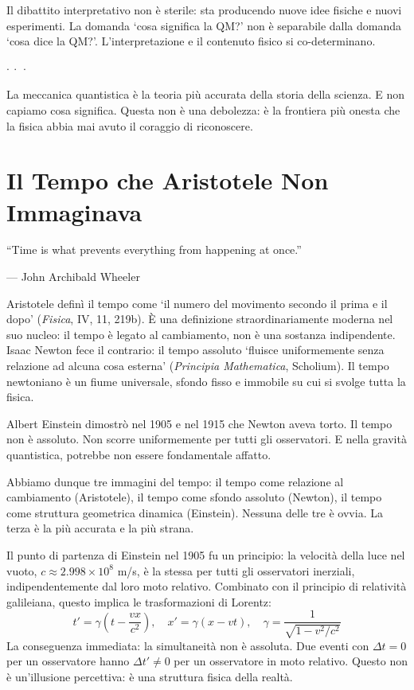\documentclass[12pt,a4paper,openany]{book}
\newcommand{\sezione}[1]{\vspace{1.2em}{\large\bfseries #1}\vspace{0.5em}\par}
\newcommand{\puntini}{\begin{center}$\cdot\ \cdot\ \cdot$\end{center}\vspace{0.3em}}
\begin{document}
Il dibattito interpretativo non è sterile: sta producendo nuove idee fisiche e nuovi esperimenti. La domanda `cosa significa la QM?' non è separabile dalla domanda `cosa dice la QM?'. L'interpretazione e il contenuto fisico si co-determinano.

\puntini

La meccanica quantistica è la teoria più accurata della storia della scienza. E non capiamo cosa significa. Questa non è una debolezza: è la frontiera più onesta che la fisica abbia mai avuto il coraggio di riconoscere.

\chapter{Il Tempo che Aristotele Non Immaginava}

\epigraph{``Time is what prevents everything from happening at once.''}{--- John Archibald Wheeler}

\sezione{Tre definizioni di tempo}

Aristotele definì il tempo come `il numero del movimento secondo il prima e il dopo' (\textit{Fisica}, IV, 11, 219b). È una definizione straordinariamente moderna nel suo nucleo: il tempo è legato al cambiamento, non è una sostanza indipendente. Isaac Newton fece il contrario: il tempo assoluto `fluisce uniformemente senza relazione ad alcuna cosa esterna' (\textit{Principia Mathematica}, Scholium). Il tempo newtoniano è un fiume universale, sfondo fisso e immobile su cui si svolge tutta la fisica.

Albert Einstein dimostrò nel 1905 e nel 1915 che Newton aveva torto. Il tempo non è assoluto. Non scorre uniformemente per tutti gli osservatori. E nella gravità quantistica, potrebbe non essere fondamentale affatto.

Abbiamo dunque tre immagini del tempo: il tempo come relazione al cambiamento (Aristotele), il tempo come sfondo assoluto (Newton), il tempo come struttura geometrica dinamica (Einstein). Nessuna delle tre è ovvia. La terza è la più accurata e la più strana.

\sezione{La relatività speciale: la simultaneità come proprietà relazionale}

Il punto di partenza di Einstein nel 1905 fu un principio: la velocità della luce nel vuoto, $c \approx 2.998 \times 10^8$ m/s, è la stessa per tutti gli osservatori inerziali, indipendentemente dal loro moto relativo. Combinato con il principio di relatività galileiana, questo implica le trasformazioni di Lorentz:
\[
t' = \gamma\!\left(t - \frac{vx}{c^2}\right),\quad x' = \gamma(x - vt),\quad \gamma = \frac{1}{\sqrt{1 - v^2/c^2}}
\]
La conseguenza immediata: la simultaneità non è assoluta. Due eventi con $\Delta t = 0$ per un osservatore hanno $\Delta t' \neq 0$ per un osservatore in moto relativo. Questo non è un'illusione percettiva: è una struttura fisica della realtà.
\end{document}
